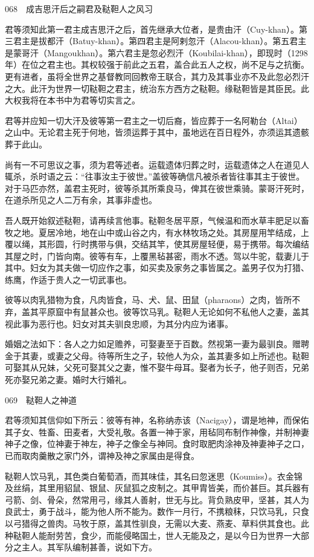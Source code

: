 \documentclass[12pt,UTF8]{ctexbook}
\begin{document}
068　成吉思汗后之嗣君及鞑靼人之风习

君等须知此第一君主成吉思汗之后，首先继承大位者，是贵由汗（Cuy-khan）。第三君主是拔都汗（Batuy-khan）。第四君主是阿剌忽汗（Alacou-khan）。第五君主是蒙哥汗（Mangoukhan）。第六君主是忽必烈汗（Koubilai-khan），即现时（1298年）在位之君主也。其权较强于前此之五君，盖合此五人之权，尚不足与之抗衡。更有进者，虽将全世界之基督教同回教帝王联合，其力及其事业亦不及此忽必烈汗之大。此汗为世界一切鞑靼之君主，统治东方西方之鞑靼。缘鞑靼皆是其臣民。此大权我将在本书中为君等切实言之。

君等并应知一切大汗及彼等第一君主之一切后裔，皆应葬于一名阿勒台（Altai）之山中。无论君主死于何地，皆须运葬于其中，虽地远在百日程外，亦须运其遗骸葬于此山。

尚有一不可思议之事，须为君等述者。运载遗体归葬之时，运载遗体之人在道见人辄杀，杀时语之云：“往事汝主于彼世。”盖彼等确信凡被杀者皆往事其主于彼世。对于马匹亦然，盖君主死时，彼等杀其所乘良马，俾其在彼世乘骑。蒙哥汗死时，在道杀所见之人二万有余，其事非虚也。

吾人既开始叙述鞑靼，请再续言他事。鞑靼冬居平原，气候温和而水草丰肥足以畜牧之地。夏居冷地，地在山中或山谷之内，有水林牧场之处。其房屋用竿结成，上覆以绳，其形圆，行时携带与俱，交结其竿，使其房屋轻便，易于携带。每次编结其屋之时，门皆向南。彼等有车，上覆黑毡甚密，雨水不透。驾以牛驼，载妻儿于其中。妇女为其夫做一切应作之事，如买卖及家务之事皆属之。盖男子仅为打猎、练鹰，作适于贵人之一切武事也。

彼等以肉乳猎物为食，凡肉皆食，马、犬、鼠、田鼠（pharaons）之肉，皆所不弃，盖其平原窟中有鼠甚众也。彼等饮马乳。鞑靼人无论如何不私他人之妻，盖其视此事为恶行也。妇女对其夫驯良忠顺，为其分内应为诸事。

婚姻之法如下：各人之力如足赡养，可娶妻至于百数。然视第一妻为最驯良。赠聘金于其妻，或妻之父母。待等所生之子，较他人为众，盖其妻多如上所述也。鞑靼可娶其从兄妹，父死可娶其父之妻，惟不娶牛母耳。娶者为长子，他子则否，兄弟死亦娶兄弟之妻。婚时大行婚礼。





069　鞑靼人之神道

君等须知其信仰如下所云：彼等有神，名称纳赤该（Nacigay），谓是地神，而保佑其子女、牲畜、田麦者，大受礼敬。各置一神于家，用毡同布制作神像，并制神妻神子之像，位神妻于神左，神子之像全与神同。食时取肥肉涂神及神妻神子之口，已而取肉羹散之家门外，谓神及神之家属由是得食。

鞑靼人饮马乳，其色类白葡萄酒，而其味佳，其名曰忽迷思（Koumiss）。衣金锦及丝绢，其里用貂鼠、银鼠、灰鼠狐之皮制之。其甲胄皆美，而价甚巨。其兵器有弓箭、剑、骨朵，然常用弓，缘其人善射，世无与比。背负熟皮甲，坚甚，其人为良武士，勇于战斗，能为他人所不能为。数作一月行，不携粮秣，只饮马乳，只食以弓猎得之兽肉。马牧于原，盖其性驯良，无需以大麦、燕麦、草料供其食也。此种鞑靼人能耐劳苦，食少，而能侵略国土，世人无能及之，是以今日为世界一大部分之主人。其军队编制甚善，说如下方。
\end{document}
